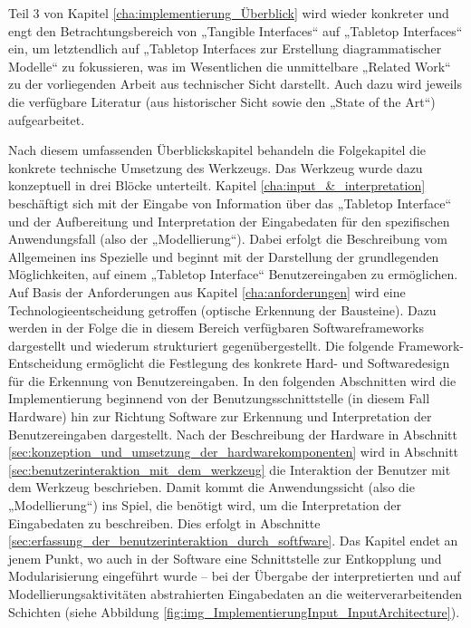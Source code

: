 Teil 3 von Kapitel \ref{cha:implementierung_Überblick} wird wieder konkreter und engt den Betrachtungsbereich von „Tangible Interfaces“ auf „Tabletop Interfaces“ ein, um letztendlich auf „Tabletop Interfaces zur Erstellung diagrammatischer Modelle“ zu fokussieren, was im Wesentlichen die unmittelbare „Related Work“ zu der vorliegenden Arbeit aus technischer Sicht darstellt. Auch dazu wird jeweils die verfügbare Literatur (aus historischer Sicht sowie den „State of the Art“) aufgearbeitet.

Nach diesem umfassenden Überblickskapitel behandeln die Folgekapitel die konkrete technische Umsetzung des Werkzeugs. Das Werkzeug wurde dazu konzeptuell in drei Blöcke unterteilt. Kapitel \ref{cha:input_&_interpretation} beschäftigt sich mit der Eingabe von Information über das „Tabletop Interface“ und der Aufbereitung und Interpretation der Eingabedaten für den spezifischen Anwendungsfall (also der „Modellierung“). Dabei erfolgt die Beschreibung vom Allgemeinen ins Spezielle und beginnt mit der Darstellung der grundlegenden Möglichkeiten, auf einem „Tabletop Interface“ Benutzereingaben zu ermöglichen. Auf Basis der Anforderungen aus Kapitel \ref{cha:anforderungen} wird eine Technologieentscheidung getroffen (optische Erkennung der Bausteine). Dazu werden in der Folge die in diesem Bereich verfügbaren Softwareframeworks dargestellt und wiederum strukturiert gegenübergestellt. Die folgende Framework-Entscheidung ermöglicht die Festlegung des konkrete Hard- und Softwaredesign für die Erkennung von Benutzereingaben. In den folgenden Abschnitten wird die Implementierung beginnend von der Benutzungsschnittstelle (in diesem Fall Hardware) hin zur Richtung Software zur Erkennung und Interpretation der Benutzereingaben dargestellt. Nach der Beschreibung der Hardware in Abschnitt \ref{sec:konzeption_und_umsetzung_der_hardwarekomponenten} wird in Abschnitt \ref{sec:benutzerinteraktion_mit_dem_werkzeug} die Interaktion der Benutzer mit dem Werkzeug beschrieben. Damit kommt die Anwendungssicht (also die „Modellierung“) ins Spiel, die benötigt wird, um die Interpretation der Eingabedaten zu beschreiben. Dies erfolgt in Abschnitte \ref{sec:erfassung_der_benutzerinteraktion_durch_softfware}. Das Kapitel endet an jenem Punkt, wo auch in der Software eine Schnittstelle zur Entkopplung und Modularisierung eingeführt wurde -- bei der Übergabe der interpretierten und auf Modellierungsaktivitäten abstrahierten Eingabedaten an die weiterverarbeitenden Schichten (siehe Abbildung \ref{fig:img_ImplementierungInput_InputArchitecture}).

